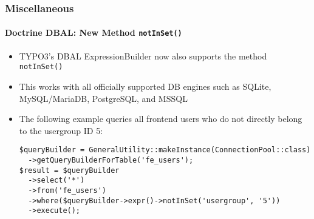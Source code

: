 %

\begin{frame}[fragile]
	\frametitle{Miscellaneous}
	\framesubtitle{Doctrine DBAL: New Method \texttt{notInSet()}}


	\begin{itemize}
		\item TYPO3's DBAL ExpressionBuilder now also supports the method \texttt{notInSet()}
		\item This works with all officially supported DB engines such as SQLite,
			MySQL/MariaDB, PostgreSQL, and MSSQL
		\item The following example queries all frontend users who do not directly
			belong to the usergroup ID 5:
\begin{lstlisting}
$queryBuilder = GeneralUtility::makeInstance(ConnectionPool::class)
  ->getQueryBuilderForTable('fe_users');
$result = $queryBuilder
  ->select('*')
  ->from('fe_users')
  ->where($queryBuilder->expr()->notInSet('usergroup', '5'))
  ->execute();
\end{lstlisting}

	\end{itemize}

\end{frame}

